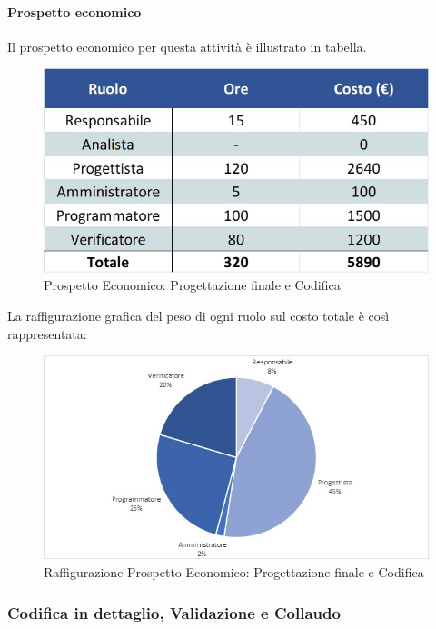 \paragraph{Prospetto economico}
Il prospetto economico per questa attività è illustrato in tabella. 
\begin{figure}[h!]
	\centerline{\includegraphics[scale=0.4]{img/Preventivo/ProgettazioneFinaleCodifica.Economico.jpg}}
	\caption{Prospetto Economico: Progettazione finale e Codifica}
\end{figure}
La raffigurazione grafica del peso di ogni ruolo sul costo totale è così rappresentata: 
\begin{figure}[h!]
	\centerline{\includegraphics[scale=0.4]{img/Preventivo/Torte/ProgettazioneFinaleCodifica.jpg}}
	\caption{Raffigurazione Prospetto Economico: Progettazione finale e Codifica}
\end{figure} 

\subsubsection{Codifica in dettaglio, Validazione e Collaudo}
